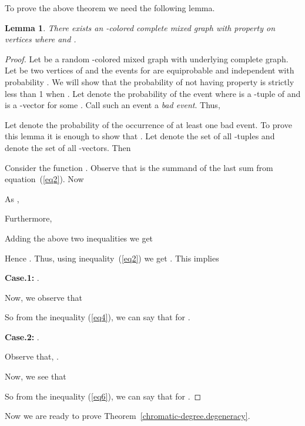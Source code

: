 \documentclass[11pt]{article}
\newtheorem{lemma}[theorem]{Lemma}
\begin{document}
 
To prove the above theorem we need the following lemma. 

\begin{lemma}\label{key-lemma}
There exists an  -colored complete mixed graph  with property  on  vertices
where  and . 
\end{lemma} 


\begin{proof}
Let  be a random -colored  mixed graph with underlying complete graph. Let  be two vertices of  and the events 
for  are equiprobable and independent  with probability . 
We will show that the probability of  not having property  is strictly less than 1 when 
. Let  denote the probability of the event  where  is a -tuple of  and  is a -vector for some . Call such an event a \textit{bad event}. Thus,




Let  denote the probability of the occurrence of at least one bad event. 
To prove this lemma it is enough to  show that . Let  denote the set of all -tuples and  denote the set of all -vectors.  Then 



Consider the function . Observe that  is the  
summand  of the last sum from equation~(\ref{eq2}). 
Now


As ,   

Furthermore,  
 
 Adding the above two inequalities we get 
 

Hence . Thus, using inequality~(\ref{eq2}) we get 
.  This implies
 
\medskip 
 




\medskip

\textbf{Case.1:} .



Now, we observe that



So from the inequality (\ref{eq4}), we can say that  for .


\medskip

\textbf{Case.2:} .



Observe that, .

Now, we see that 


So from the inequality (\ref{eq6}), we can say that  for .
\end{proof}

Now we are ready to prove Theorem~\ref{chromatic-degree.degeneracy}.
\end{document}
